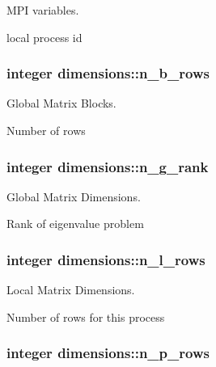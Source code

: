 M\+P\+I variables. 

local process id \hypertarget{namespacedimensions_a70149f9e62c94abbe272f7744460e6a7}{}
\subsubsection[{n\+\_\+b\+\_\+rows}]{\setlength{\rightskip}{0pt plus 5cm}integer dimensions\+::n\+\_\+b\+\_\+rows}\label{namespacedimensions_a70149f9e62c94abbe272f7744460e6a7}


Global Matrix Blocks. 

Number of rows \hypertarget{namespacedimensions_a9376ca9c441df4fbb42e61ae24871472}{}
\subsubsection[{n\+\_\+g\+\_\+rank}]{\setlength{\rightskip}{0pt plus 5cm}integer dimensions\+::n\+\_\+g\+\_\+rank}\label{namespacedimensions_a9376ca9c441df4fbb42e61ae24871472}


Global Matrix Dimensions. 

Rank of eigenvalue problem \hypertarget{namespacedimensions_a910d07df719e9e944e11513f92f923f5}{}
\subsubsection[{n\+\_\+l\+\_\+rows}]{\setlength{\rightskip}{0pt plus 5cm}integer dimensions\+::n\+\_\+l\+\_\+rows}\label{namespacedimensions_a910d07df719e9e944e11513f92f923f5}


Local Matrix Dimensions. 

Number of rows for this process \hypertarget{namespacedimensions_a397d214568d37d3ec2483b2779dcfee0}{}
\subsubsection[{n\+\_\+p\+\_\+rows}]{\setlength{\rightskip}{0pt plus 5cm}integer dimensions\+::n\+\_\+p\+\_\+rows}\label{namespacedimensions_a397d214568d37d3ec2483b2779dcfee0}


